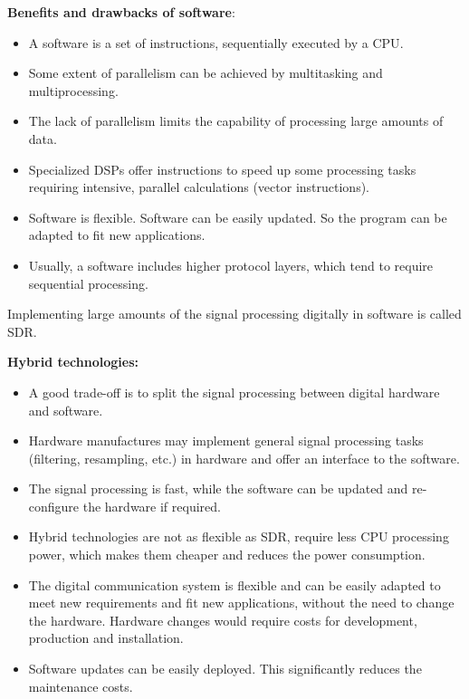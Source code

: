 \begin{refsection}
\textbf{Benefits and drawbacks of software}:
\begin{itemize}
	\item A software is a set of instructions, sequentially executed by a \ac{CPU}.
	\item Some extent of parallelism can be achieved by multitasking and multiprocessing.
	\item The lack of parallelism limits the capability of processing large amounts of data.
	\item Specialized \acp{DSP} offer instructions to speed up some processing tasks requiring intensive, parallel calculations (vector instructions).
	\item Software is flexible. Software can be easily updated. So the program can be adapted to fit new applications.
	\item Usually, a software includes higher protocol layers, which tend to require sequential processing.
\end{itemize}

\begin{fact}
	Implementing large amounts of the signal processing digitally in software is called \acf{SDR}.
\end{fact}

\textbf{Hybrid technologies:}
\begin{itemize}
	\item A good trade-off is to split the signal processing between digital hardware and software.
	\item Hardware manufactures may implement general signal processing tasks (filtering, resampling, etc.) in hardware and offer an interface to the software.
	\item The signal processing is fast, while the software can be updated and re-configure the hardware if required.
	\item Hybrid technologies are not as flexible as \ac{SDR}, require less \ac{CPU} processing power, which makes them cheaper and reduces the power consumption.
	\item The digital communication system is flexible and can be easily adapted to meet new requirements and fit new applications, without the need to change the hardware. Hardware changes would require costs for development, production and installation.
	\item Software updates can be easily deployed. This significantly reduces the maintenance costs.
\end{itemize}


\end{refsection}
